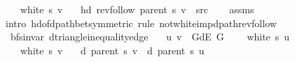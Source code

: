 \begin{isabellebody}
\ \ \ {\isachardoublequoteopen}{\isasymnot}\ white\ s\ v{\isachardoublequoteclose}\isanewline
\ \ \ {\isachardoublequoteopen}hd\ {\isacharparenleft}{\kern0pt}rev{\isacharunderscore}{\kern0pt}follow\ {\isacharparenleft}{\kern0pt}parent\ s{\isacharparenright}{\kern0pt}\ v{\isacharparenright}{\kern0pt}\ {\isacharequal}{\kern0pt}\ src{\isachardoublequoteclose}%
\endisataginvisible
{\isafoldinvisible}%
%
\isadeliminvisible
\isanewline
%
\endisadeliminvisible
%
\isadelimproof
\ \ %
\endisadelimproof
%
\isatagproof
{}\isamarkupfalse%
\ assms\isanewline
\ \ \isamarkupfalse%
\ {\isacharparenleft}{\kern0pt}intro\ hd{\isacharunderscore}{\kern0pt}of{\isacharunderscore}{\kern0pt}dpath{\isacharunderscore}{\kern0pt}bet{\isacharprime}{\kern0pt}{\isacharbrackleft}{\kern0pt}symmetric{\isacharbrackright}{\kern0pt}{\isacharparenright}{\kern0pt}\ {\isacharparenleft}{\kern0pt}rule\ not{\isacharunderscore}{\kern0pt}white{\isacharunderscore}{\kern0pt}imp{\isacharunderscore}{\kern0pt}dpath{\isacharunderscore}{\kern0pt}rev{\isacharunderscore}{\kern0pt}follow{\isacharparenright}{\kern0pt}%
\endisatagproof
{\isafoldproof}%
%
\isadelimproof
\isanewline
%
\endisadelimproof
%
\isadeliminvisible
\isanewline
%
\endisadeliminvisible
%
\isataginvisible
{}\isamarkupfalse%
\ {\isacharparenleft}{\kern0pt}\ bfs{\isacharunderscore}{\kern0pt}invar{\isacharparenright}{\kern0pt}\ d{\isacharunderscore}{\kern0pt}triangle{\isacharunderscore}{\kern0pt}inequality{\isacharunderscore}{\kern0pt}edge{\isacharcolon}{\kern0pt}\isanewline
\ \ \ {\isachardoublequoteopen}{\isacharparenleft}{\kern0pt}u{\isacharcomma}{\kern0pt}\ v{\isacharparenright}{\kern0pt}\ {\isasymin}\ G{\isachardot}{\kern0pt}dE\ G{\isachardoublequoteclose}\isanewline
\ \ \ {\isachardoublequoteopen}{\isasymnot}\ white\ s\ u{\isachardoublequoteclose}\isanewline
\ \ \ {\isachardoublequoteopen}{\isasymnot}\ white\ s\ v{\isachardoublequoteclose}\isanewline
\ \ \ {\isachardoublequoteopen}d\ {\isacharparenleft}{\kern0pt}parent\ s{\isacharparenright}{\kern0pt}\ v\ {\isasymle}\ d\ {\isacharparenleft}{\kern0pt}parent\ s{\isacharparenright}{\kern0pt}\ u\ {\isacharplus}{\kern0pt}\ {}{\isachardoublequoteclose}%
\endisataginvisible
{\isafoldinvisible}%
%
\isadeliminvisible
\isanewline
%
\endisadeliminvisible
%
\isadelimproof
%
\endisadelimproof
%
\isatagproof
{}\isamarkupfalse%
\ {\isacharminus}{\kern0pt}\isanewline
\ \ \isamarkupfalse%

\end{isabellebody}
